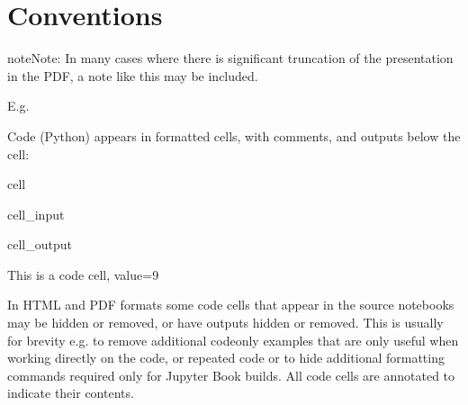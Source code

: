 \documentclass[letterpaper,table,10pt,english]{jupyterBook}
\begin{document}
\section{Conventions}
\label{\detokenize{frontmatter/book_versions_note:conventions}}
\begin{sphinxShadowBox}
\sphinxstylesidebartitle{}

\begin{sphinxadmonition}{note}{Note:}
\sphinxAtStartPar
In many cases where there is significant truncation of the presentation in the PDF, a note like this may be included.

\sphinxAtStartPar
E.g. 
\end{sphinxadmonition}
\end{sphinxShadowBox}

\sphinxAtStartPar
Code (Python) appears in formatted cells, with comments, and outputs below the cell:

\begin{sphinxuseclass}{cell}\begin{sphinxVerbatimInput}

\begin{sphinxuseclass}{cell_input}
\begin{sphinxVerbatim}[commandchars=\\\{\}]
  
\end{sphinxVerbatim}

\end{sphinxuseclass}\end{sphinxVerbatimInput}
\begin{sphinxVerbatimOutput}

\begin{sphinxuseclass}{cell_output}
\begin{sphinxVerbatim}[commandchars=\\\{\}]
This is a code cell, value=9
\end{sphinxVerbatim}

\end{sphinxuseclass}\end{sphinxVerbatimOutput}

\end{sphinxuseclass}
\sphinxAtStartPar
In HTML and PDF formats some code cells that appear in the source notebooks may be hidden or removed, or have outputs hidden or removed. This is usually for brevity \sphinxhyphen{} e.g. to remove additional code\sphinxhyphen{}only examples that are only useful when working directly on the code, or repeated code \sphinxhyphen{} or to hide additional formatting commands required only for Jupyter Book builds. All code cells are annotated to indicate their contents.
\end{document}
